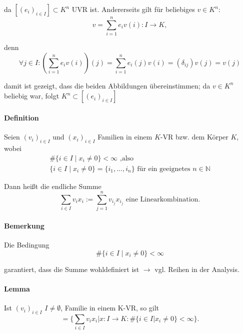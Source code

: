 	da $[(e_i)_{i\in I}] \subset K^n$ UVR ist. Andererseits gilt für beliebiges $v\in K^n$:
	\begin{equation*}
		v=\sum^n_{i=1}e_iv(i): I\to K,
	\end{equation*}
	
	denn
	\begin{equation*}
		\forall j\in I: \left(\sum^n_{i=1} e_iv(i)\right)(j) = \sum^n_{i=1}e_i(j)v(i) = (\delta_{ij}) v(j) = v(j)
	\end{equation*}
	
	damit ist gezeigt, dass die beiden Abbildungen übereinstimmen; da $v\in K^n$ beliebig war, folgt $K^n \subset [(e_i)_{i\in I}]$
	
\paragraph{Definition}
	Seien $(v_i)_{i\in I}$ und $(x_i)_{i\in I}$ Familien in einem $ K $-VR bzw. dem Körper $ K $, wobei
	\begin{gather*}
		\# \{i\in I\mid x_i \neq 0\} < \infty\text{ ,also}\\
		\{ i\in I \mid x_i \neq 0\} = \{i_1,...,i_n\}\text{ für ein geeignetes } n\in \mathbb{N}
	\end{gather*}
	
	
	Dann heißt die endliche Summe
	\begin{equation*}
    	\sum_{i\in I} v_ix_i:= \sum^n_{j=1}v_{i_j}x_{i_j}\text{ eine Linearkombination.}
	\end{equation*}

\paragraph{Bemerkung}
	Die Bedingung
	\begin{equation*}
		\#\{i\in I \mid x_i\neq 0\} <\infty
	\end{equation*}
	
	garantiert, dass die Summe wohldefiniert ist $\rightarrow$ vgl. Reihen in der Analysis.
		
\paragraph{Lemma}
	Ist $(v_i)_{i\in I}$ $I \neq \emptyset$, Familie in einem K-VR, so gilt 
	\begin{equation*}
		[(v_i)_{i\in I}] = \{\sum_{i\in I} v_ix_i| x: I\to K: \# \{i\in I| x_i \neq 0\}< \infty\}.
	\end{equation*}
	
